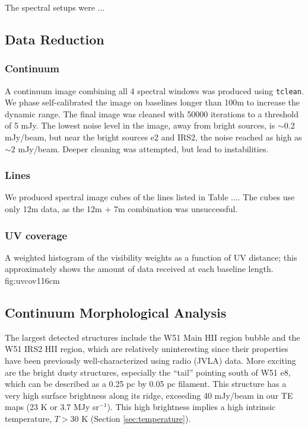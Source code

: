 \documentclass{aa}
\begin{document}
The spectral setups were ...

\subsection{Data Reduction}
\subsubsection{Continuum}
A continuum image combining all 4 spectral windows was produced using
\texttt{tclean}.  We phase self-calibrated the image on baselines longer than
100m to increase the dynamic range.  The final image was cleaned with 50000
iterations to a threshold of 5 mJy.  The lowest noise level in the image, away
from bright sources, is $\sim0.2$ mJy/beam, but near the bright sources e2 and
IRS2, the noise reached as high as $\sim2$ mJy/beam.  Deeper cleaning was
attempted, but lead to instabilities.


\subsubsection{Lines}
We produced spectral image cubes of the lines listed in Table ....
The cubes use only 12m data, as the 12m + 7m combination was unsuccessful.


\subsubsection{UV coverage}
{A weighted histogram of the visibility weights as a function of UV distance;
this approximately shows the amount of data received at each baseline length.}
{fig:uvcov}{1}{16cm}

\subsection{Continuum Morphological Analysis}
\label{sec:morphology}
The largest detected structures include the W51 Main HII region bubble and the
W51 IRS2 HII region, which are relatively uninteresting since their properties
have been previously well-characterized using radio (JVLA) data.  More exciting
are the bright dusty structures, especially the ``tail'' pointing south of W51
e8, which can be described as a 0.25 pc by 0.05 pc filament. This structure has
a very high surface brightness along its ridge, exceeding 40 mJy/beam in our TE
maps (23 K or 3.7 MJy sr$^{-1}$).  This high brightness implies a high
intrinsic temperature, $T>30$ K (Section \ref{sec:temperature}).
\end{document}

